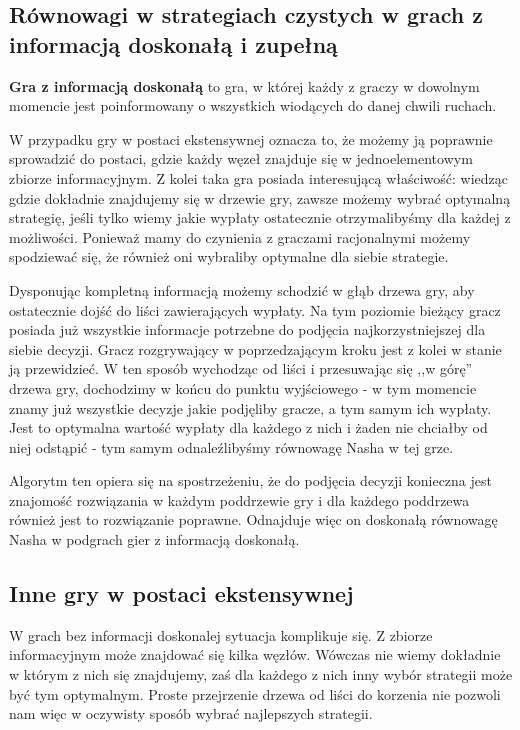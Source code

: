 \documentclass[polish]{standalone}
\begin{document}
\subsection{Równowagi w strategiach czystych w grach z informacją doskonałą i zupełną}

\begin{definition}
\textbf{Gra z informacją doskonałą} to gra, w której każdy z graczy w dowolnym momencie jest poinformowany o wszystkich
wiodących do danej chwili ruchach.
\end{definition}

W przypadku gry w postaci ekstensywnej oznacza to, że możemy ją poprawnie sprowadzić do postaci, gdzie każdy węzeł
znajduje się w jednoelementowym zbiorze informacyjnym. Z kolei taka gra posiada interesującą właściwość: wiedząc gdzie
dokładnie znajdujemy się w drzewie gry, zawsze możemy wybrać optymalną strategię, jeśli tylko wiemy jakie wypłaty
ostatecznie otrzymalibyśmy dla każdej z możliwości. Ponieważ mamy do czynienia z graczami racjonalnymi możemy spodziewać
się, że również oni wybraliby optymalne dla siebie strategie.

Dysponując kompletną informacją możemy schodzić w głąb drzewa gry, aby ostatecznie dojść do liści zawierających wypłaty.
Na tym poziomie bieżący gracz posiada już wszystkie informacje potrzebne do podjęcia najkorzystniejszej dla siebie
decyzji. Gracz rozgrywający w poprzedzającym kroku jest z kolei w stanie ją przewidzieć. W ten sposób wychodząc od liści
i przesuwając się ,,w górę'' drzewa gry, dochodzimy w końcu do punktu wyjściowego - w tym momencie znamy już wszystkie
decyzje jakie podjęliby gracze, a tym samym ich wypłaty. Jest to optymalna wartość wypłaty dla każdego z nich i żaden
nie chciałby od niej odstąpić - tym samym odnaleźlibyśmy równowagę Nasha w tej grze.

Algorytm ten opiera się na spostrzeżeniu, że do podjęcia decyzji konieczna jest znajomość rozwiązania w każdym
poddrzewie gry i dla każdego poddrzewa również jest to rozwiązanie poprawne. Odnajduje więc on doskonałą równowagę
Nasha w podgrach gier z informacją doskonałą.

\subsection{Inne gry w postaci ekstensywnej}

W grach bez informacji doskonalej sytuacja komplikuje się. Z zbiorze informacyjnym może znajdować się kilka węzłów.
Wówczas nie wiemy dokładnie w którym z nich się znajdujemy, zaś dla każdego z nich inny wybór strategii może być tym
optymalnym. Proste przejrzenie drzewa od liści do korzenia nie pozwoli nam więc w oczywisty sposób wybrać najlepszych
strategii.
\end{document}
